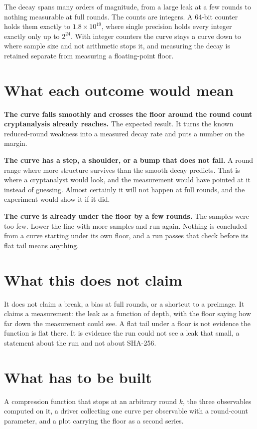 The decay spans many orders of magnitude, from a large leak at a few rounds to nothing measurable at full rounds. The counts are integers. A 64-bit counter holds them exactly to \(1.8 \times 10^{19}\), where single precision holds every integer exactly only up to \(2^{24}\). With integer counters the curve stays a curve down to where sample size and not arithmetic stops it, and measuring the decay is retained separate from measuring a floating-point floor.

\section{What each outcome would mean}

\textbf{The curve falls smoothly and crosses the floor around the round count cryptanalysis already reaches.} The expected result. It turns the known reduced-round weakness into a measured decay rate and puts a number on the margin.

\textbf{The curve has a step, a shoulder, or a bump that does not fall.} A round range where more structure survives than the smooth decay predicts. That is where a cryptanalyst would look, and the measurement would have pointed at it instead of guessing. Almost certainly it will not happen at full rounds, and the experiment would show it if it did.

\textbf{The curve is already under the floor by a few rounds.} The samples were too few. Lower the line with more samples and run again. Nothing is concluded from a curve starting under its own floor, and a run passes that check before its flat tail means anything.

\section{What this does not claim}

It does not claim a break, a bias at full rounds, or a shortcut to a preimage. It claims a measurement: the leak as a function of depth, with the floor saying how far down the measurement could see. A flat tail under a floor is not evidence the function is flat there. It is evidence the run could not see a leak that small, a statement about the run and not about SHA-256.

\section{What has to be built}

A compression function that stops at an arbitrary round \(k\), the three observables computed on it, a driver collecting one curve per observable with a round-count parameter, and a plot carrying the floor as a second series.

